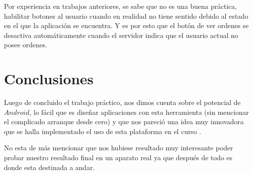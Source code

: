 \documentclass[english]{article}
\begin{document}
Por experiencia en trabajos anteriores, se sabe que no es una buena
práctica, habilitar botones al usuario cuando en realidad no tiene
sentido debido al estado en el que la aplicación se encuentra. Y es
por esto que el botón de ver ordenes se desactiva automáticamente
cuando el servidor indica que el usuario actual no posee ordenes.\\



\section{Conclusiones}

Luego de concluido el trabajo práctico, nos dimos cuenta sobre el
potencial de $Android$, lo fácil que es diseñar aplicaciones con
esta herramienta (sin mencionar el complicado arranque desde cero)
y que nos pareció una idea muy innovadora que se halla implementado
el uso de esta plataforma en el curso .

No esta de más mencionar que nos hubiese resultado muy interesante
poder probar nuestro resultado final en un aparato real ya que después
de todo es donde esta destinada a andar.
\end{document}
